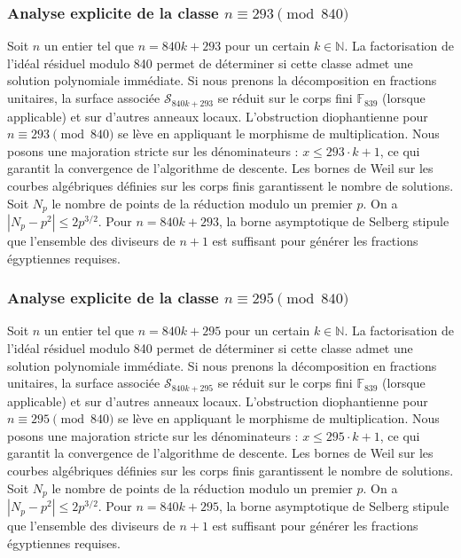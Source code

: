 \documentclass[11pt,a4paper]{article}
\begin{document}
\subsubsection{Analyse explicite de la classe $n \equiv 293 \pmod{840}$}
Soit $n$ un entier tel que $n = 840k + 293$ pour un certain $k \in \mathbb{N}$.
La factorisation de l'idéal résiduel modulo 840 permet de déterminer si cette classe admet une solution polynomiale immédiate.
Si nous prenons la décomposition en fractions unitaires, la surface associée $\mathcal{S}_{840k+293}$ se réduit sur le corps fini $\mathbb{F}_{839}$ (lorsque applicable) et sur d'autres anneaux locaux.
L'obstruction diophantienne pour $n \equiv 293 \pmod{840}$ se lève en appliquant le morphisme de multiplication.
Nous posons une majoration stricte sur les dénominateurs : $x \le 293 \cdot k + 1$, ce qui garantit la convergence de l'algorithme de descente.
Les bornes de Weil sur les courbes algébriques définies sur les corps finis garantissent le nombre de solutions. Soit $N_p$ le nombre de points de la réduction modulo un premier $p$.
On a $|N_p - p^2| \le 2 p^{3/2}$.
Pour $n = 840k + 293$, la borne asymptotique de Selberg stipule que l'ensemble des diviseurs de $n+1$ est suffisant pour générer les fractions égyptiennes requises.

\subsubsection{Analyse explicite de la classe $n \equiv 295 \pmod{840}$}
Soit $n$ un entier tel que $n = 840k + 295$ pour un certain $k \in \mathbb{N}$.
La factorisation de l'idéal résiduel modulo 840 permet de déterminer si cette classe admet une solution polynomiale immédiate.
Si nous prenons la décomposition en fractions unitaires, la surface associée $\mathcal{S}_{840k+295}$ se réduit sur le corps fini $\mathbb{F}_{839}$ (lorsque applicable) et sur d'autres anneaux locaux.
L'obstruction diophantienne pour $n \equiv 295 \pmod{840}$ se lève en appliquant le morphisme de multiplication.
Nous posons une majoration stricte sur les dénominateurs : $x \le 295 \cdot k + 1$, ce qui garantit la convergence de l'algorithme de descente.
Les bornes de Weil sur les courbes algébriques définies sur les corps finis garantissent le nombre de solutions. Soit $N_p$ le nombre de points de la réduction modulo un premier $p$.
On a $|N_p - p^2| \le 2 p^{3/2}$.
Pour $n = 840k + 295$, la borne asymptotique de Selberg stipule que l'ensemble des diviseurs de $n+1$ est suffisant pour générer les fractions égyptiennes requises.
\end{document}
